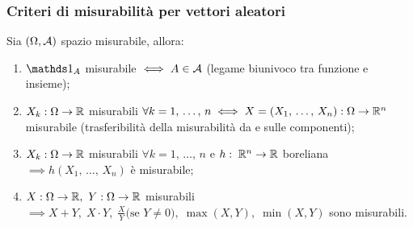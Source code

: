 \subsubsection{Criteri di misurabilità per vettori aleatori}
\begin{teob}[\JPTh{8.4}]
  \label{teo-va-mis}
  Sia $(\Omega, \mathcal A)$ spazio misurabile, allora:
  \begin{enumerate}
    \item $\Ind_{A}$ misurabile $\iff A \in \mathcal A$ (legame biunivoco tra funzione e insieme);
    \item $X_k : \Omega \to \mathbb R $ misurabili $ \forall k = 1, \, \dots, \, n \iff X = (X_1, \, \dots, \, X_n): \Omega \to \mathbb R^n$ misurabile
      (trasferibilità della misurabilità da e sulle componenti);
    \item $X_k: \Omega \to \mathbb R $ misurabili $ \forall k = 1, \, \dots,\, n$ e $h: \; \mathbb R^n \to \mathbb R$ boreliana\\
      $\implies h(X_1,  \, \dots,\, X_n)$ è misurabile;
    \item $X: \Omega \to \mathbb R, \ Y:\Omega \to \mathbb R$ misurabili\\
      $\implies X+Y,\; X \cdot Y,\; \frac X Y \text{(se $Y \neq 0$)},\; \max(X, Y),\; \min(X, Y)$ sono misurabili.
  \end{enumerate}
\end{teob}
